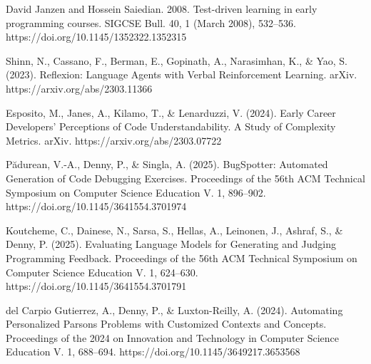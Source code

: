 \documentclass[12pt]{extarticle}
\begin{document}
\begin{thebibliography}{9}
David Janzen and Hossein Saiedian. 2008. Test-driven learning in early programming courses. SIGCSE Bull. 40, 1 (March 2008), 532–536. https://doi.org/10.1145/1352322.1352315

Shinn, N., Cassano, F., Berman, E., Gopinath, A., Narasimhan, K., \& Yao, S. (2023). Reflexion: Language Agents with Verbal Reinforcement Learning. arXiv. https://arxiv.org/abs/2303.11366

Esposito, M., Janes, A., Kilamo, T., \& Lenarduzzi, V. (2024). Early Career Developers' Perceptions of Code Understandability. A Study of Complexity Metrics. arXiv. https://arxiv.org/abs/2303.07722

Pădurean, V.-A., Denny, P., \& Singla, A. (2025). BugSpotter: Automated Generation of Code Debugging Exercises. Proceedings of the 56th ACM Technical Symposium on Computer Science Education V. 1, 896–902. https://doi.org/10.1145/3641554.3701974

Koutcheme, C., Dainese, N., Sarsa, S., Hellas, A., Leinonen, J., Ashraf, S., \& Denny, P. (2025). Evaluating Language Models for Generating and Judging Programming Feedback. Proceedings of the 56th ACM Technical Symposium on Computer Science Education V. 1, 624–630. https://doi.org/10.1145/3641554.3701791

del Carpio Gutierrez, A., Denny, P., \& Luxton-Reilly, A. (2024). Automating Personalized Parsons Problems with Customized Contexts and Concepts. Proceedings of the 2024 on Innovation and Technology in Computer Science Education V. 1, 688–694. https://doi.org/10.1145/3649217.3653568

\end{thebibliography}
\end{document}
